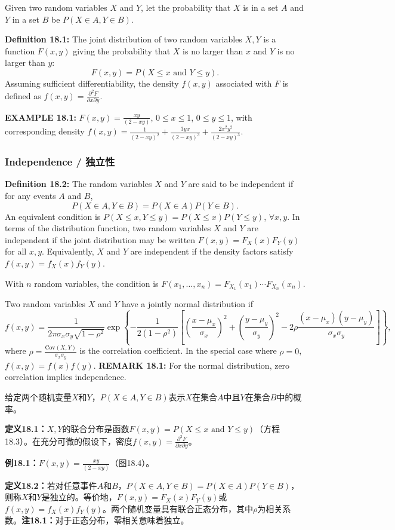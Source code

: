 \begin{original}
Given two random variables $X$ and $Y$, let the probability that $X$ is in a set $A$ and $Y$ in a set $B$ be $P(X \in A, Y \in B)$.

\textbf{Definition 18.1:} The joint distribution of two random variables $X, Y$ is a function $F(x, y)$ giving the probability that $X$ is no larger than $x$ and $Y$ is no larger than $y$:
\[
F(x, y) = P(X \leq x \text{ and } Y \leq y). \tag{18.3}
\]
Assuming sufficient differentiability, the density $f(x, y)$ associated with $F$ is defined as $f(x, y) = \frac{\partial^2 F}{\partial x \partial y}$.

\textbf{EXAMPLE 18.1:} $F(x, y) = \frac{xy}{(2 - xy)}$, $0 \leq x \leq 1$, $0 \leq y \leq 1$, with corresponding density $f(x, y) = \frac{1}{(2-xy)^2} + \frac{3yx}{(2-xy)^3} + \frac{2x^2 y^2}{(2-xy)^3}$.

\subsubsection{Independence / 独立性}

\textbf{Definition 18.2:} The random variables $X$ and $Y$ are said to be independent if for any events $A$ and $B$,
\[
P(X \in A, Y \in B) = P(X \in A)P(Y \in B). \tag{18.5}
\]
An equivalent condition is $P(X \leq x, Y \leq y) = P(X \leq x)P(Y \leq y)$, $\forall x, y$. In terms of the distribution function, two random variables $X$ and $Y$ are independent if the joint distribution may be written $F(x, y) = F_X(x)F_Y(y)$ for all $x, y$. Equivalently, $X$ and $Y$ are independent if the density factors satisfy $f(x, y) = f_X(x) f_Y(y)$.

With $n$ random variables, the condition is $F(x_1, \ldots, x_n) = F_{X_1}(x_1) \cdots F_{X_n}(x_n)$.

Two random variables $X$ and $Y$ have a jointly normal distribution if
\[
f(x, y) = \frac{1}{2\pi\sigma_x\sigma_y\sqrt{1-\rho^2}} \exp\left\{-\frac{1}{2(1-\rho^2)}\left[\left(\frac{x-\mu_x}{\sigma_x}\right)^2 + \left(\frac{y-\mu_y}{\sigma_y}\right)^2 - 2\rho\frac{(x-\mu_x)(y-\mu_y)}{\sigma_x\sigma_y}\right]\right\},
\]
where $\rho = \frac{\text{Cov}(X,Y)}{\sigma_x\sigma_y}$ is the correlation coefficient. In the special case where $\rho = 0$, $f(x, y) = f(x)f(y)$. \textbf{REMARK 18.1:} For the normal distribution, zero correlation implies independence.
\end{original}
\begin{translation}
给定两个随机变量$X$和$Y$，$P(X \in A, Y \in B)$表示$X$在集合$A$中且$Y$在集合$B$中的概率。

\textbf{定义18.1：}$X, Y$的联合分布是函数$F(x, y) = P(X \leq x \text{ and } Y \leq y)$（方程18.3）。在充分可微的假设下，密度$f(x, y) = \frac{\partial^2 F}{\partial x \partial y}$。

\textbf{例18.1：}$F(x, y) = \frac{xy}{(2 - xy)}$（图18.4）。

\textbf{定义18.2：}若对任意事件$A$和$B$，$P(X \in A, Y \in B) = P(X \in A)P(Y \in B)$，则称$X$和$Y$是独立的。等价地，$F(x, y) = F_X(x)F_Y(y)$或$f(x, y) = f_X(x) f_Y(y)$。两个随机变量具有联合正态分布，其中$\rho$为相关系数。\textbf{注18.1：}对于正态分布，零相关意味着独立。
\end{translation}

